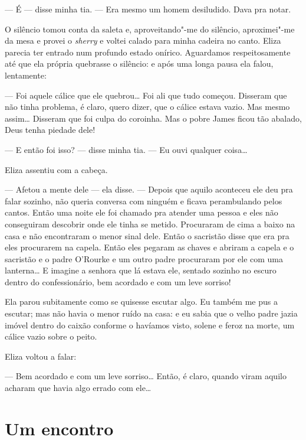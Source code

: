 --- É --- disse minha tia.  --- Era mesmo um homem desiludido.  Dava pra
notar.

O silêncio tomou conta da saleta e, aproveitando"-me do silêncio, aproximei"-me
da mesa e provei o \textit{sherry} e voltei calado para minha cadeira no canto.
Eliza parecia ter entrado num profundo estado onírico.  Aguardamos
respeitosamente até que ela própria quebrasse o silêncio: e após uma longa
pausa ela falou, lentamente:

--- Foi aquele cálice que ele quebrou\ldots{} Foi ali que tudo começou.
Disseram que não tinha problema, é claro, quero dizer, que o cálice estava
vazio.  Mas mesmo assim\ldots{} Disseram que foi culpa do coroinha.  Mas o
pobre James ficou tão abalado, Deus tenha piedade dele!

--- E então foi isso? --- disse minha tia.  --- Eu ouvi qualquer
coisa\ldots{}

Eliza assentiu com a cabeça.

--- Afetou a mente dele --- ela disse.  --- Depois que aquilo aconteceu ele
deu pra falar sozinho, não queria conversa com ninguém e ficava perambulando
pelos cantos.  Então uma noite ele foi chamado pra atender uma pessoa e eles
não conseguiram descobrir onde ele tinha se metido.  Procuraram de cima a baixo
na casa e não encontraram o menor sinal dele.  Então o sacristão disse que era
pra eles procurarem na capela.  Então eles pegaram as chaves e abriram a capela
e o sacristão e o padre O’Rourke e um outro padre procuraram por ele com uma
lanterna\ldots{} E imagine a senhora que lá estava ele, sentado sozinho no
escuro dentro do confessionário, bem acordado e com um leve sorriso!

Ela parou subitamente como se quisesse escutar algo.  Eu também me pus a
escutar; mas não havia o menor ruído na casa: e eu sabia que o velho padre
jazia imóvel dentro do caixão conforme o havíamos visto, solene e feroz na
morte, um cálice vazio sobre o peito.

Eliza voltou a falar:

--- Bem acordado e com um leve sorriso\ldots{} Então, é claro, quando viram
aquilo acharam que havia algo errado com ele\ldots{}


\chapter{Um encontro}

